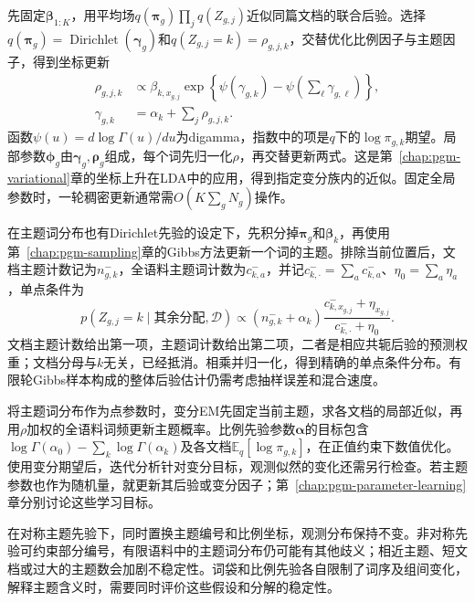 先固定$\bm\beta_{1:K}$，用平均场$q(\bm\pi_g)\prod_jq(Z_{g,j})$近似同篇文档的联合后验。选择$q(\bm\pi_g)=\operatorname{Dirichlet}(\bm\gamma_g)$和$q(Z_{g,j}=k)=\rho_{g,j,k}$，交替优化比例因子与主题因子，得到坐标更新
\begin{equation}
  \label{eq:pgm-static-directed-lda-vi}
  \begin{aligned}
    \rho_{g,j,k}&\propto
      \beta_{k,x_{g,j}}
       \exp\!\left\{\psi(\gamma_{g,k})
                   -\psi\!\left(\sum_\ell\gamma_{g,\ell}\right)\right\},\\
    \gamma_{g,k}&=\alpha_k+\sum_j\rho_{g,j,k}.
  \end{aligned}
\end{equation}
函数$\psi(u)=d\log\Gamma(u)/du$为digamma，指数中的项是$q$下的$\log\pi_{g,k}$期望。局部参数$\bm\phi_g$由$\bm\gamma_g,\bm\rho_g$组成，每个词先归一化$\rho$，再交替更新两式。这是第~\ref{chap:pgm-variational}章的坐标上升在LDA中的应用，得到指定变分族内的近似。固定全局参数时，一轮稠密更新通常需$O(K\sum_gN_g)$操作。

在主题词分布也有Dirichlet先验的设定下，先积分掉$\bm\pi_g$和$\bm\beta_k$，再使用第~\ref{chap:pgm-sampling}章的Gibbs方法更新一个词的主题。排除当前位置后，文档主题计数记为$n_{g,k}^{-}$，全语料主题词计数为$c_{k,a}^{-}$，并记$c_{k,\cdot}^{-}=\sum_a c_{k,a}^{-}$、$\eta_0=\sum_a\eta_a$，单点条件为
\begin{equation}
  \label{eq:pgm-static-directed-lda-gibbs}
  p(Z_{g,j}=k\mid\text{其余分配},\mathcal{D})
     \propto (n_{g,k}^{-}+\alpha_k)
        \frac{c_{k,x_{g,j}}^{-}+\eta_{x_{g,j}}}
             {c_{k,\cdot}^{-}+\eta_0}.
\end{equation}
文档主题计数给出第一项，主题词计数给出第二项，二者是相应共轭后验的预测权重；文档分母与$k$无关，已经抵消。相乘并归一化，得到精确的单点条件分布。有限轮Gibbs样本构成的整体后验估计仍需考虑抽样误差和混合速度。

将主题词分布作为点参数时，变分EM先固定当前主题，求各文档的局部近似，再用$\rho$加权的全语料词频更新主题概率。比例先验参数$\bm\alpha$的目标包含$\log\Gamma(\alpha_0)-\sum_k\log\Gamma(\alpha_k)$及各文档$\mathbb E_q[\log\pi_{g,k}]$，在正值约束下数值优化。使用变分期望后，迭代分析针对变分目标，观测似然的变化还需另行检查。若主题参数也作为随机量，就更新其后验或变分因子；第~\ref{chap:pgm-parameter-learning}章分别讨论这些学习目标。

在对称主题先验下，同时置换主题编号和比例坐标，观测分布保持不变。非对称先验可约束部分编号，有限语料中的主题词分布仍可能有其他歧义；相近主题、短文档或过大的主题数会加剧不稳定性。词袋和比例先验各自限制了词序及组间变化，解释主题含义时，需要同时评价这些假设和分解的稳定性。

